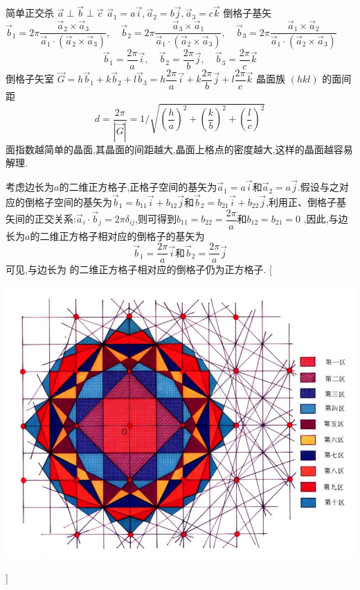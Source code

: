 \documentclass[UTF8,10pt,a4paper,oneside]{ctexart}
\begin{document}
        {简单正交杀 $\vec{a} \perp \vec{b} \perp \vec{c}$ $ \vec{a}_{1}=a\vec{i},\vec{a}_{2}=b \vec{j},\vec{a}_3=c\vec{k}$
        倒格子基矢 $\vec{b}_{1}=2 \pi \dfrac{\vec{a}_{2} \times \vec{a}_{3}}{\vec{a}_{1} \cdot (\vec{a}_{2} \times \vec{a}_{3})},\quad \vec{b}_{2}=2 \pi \dfrac{\vec{a}_{3} \times \vec{a}_{1}}{\vec{a}_{1} \cdot(\vec{a}_{2} \times \vec{a}_{3})},\quad \vec{b}_{3}=2 \pi \dfrac{\vec{a}_{1} \times \vec{a}_{2}}{\vec{a}_{1} \cdot (\vec{a}_{2} \times \vec{a}_{3})}$
        $$
        \vec{b}_{1}=\dfrac{2 \pi}{a} \vec{i},\quad \vec{b}_{2}=\dfrac{2 \pi}{b} \vec{j},\quad \vec{b}_{3}=\dfrac{2 \pi}{c} \vec{k}
        $$
        倒格子矢室 $\vec{G}=h \vec{b}_{1}+k \vec{b}_{2}+l \vec{b}_{3}=h \dfrac{2 \pi}{a} \vec{i}+k \dfrac{2 \pi}{b} \vec{j}+l \dfrac{2 \pi}{c} \vec{k}$ 晶面族  $(hkl)$ 的面间距
        $$
        d=\dfrac{2 \pi}{|\vec{G}|}=1 / \sqrt{(\dfrac{h}{a})^{2}+(\dfrac{k}{b})^{2}+(\dfrac{l}{c})^{2}}
        $$ 面指数越简单的晶面,其晶面的间距越大,晶面上格点的密度越大,这样的晶面越容易解理.}

    {考虑边长为$a$的二维正方格子,正格子空间的基矢为$\vec{a}_1=a\vec{i}$和$\vec{a}_2=a\vec{j}$.假设与之对应的倒格子空间的基矢为$\vec{b}_1=b_{11}\vec{i}+b_{12}\vec{j}$和$\vec{b}_2=b_{21}\vec{i}+b_{22}\vec{j}$,利用正、倒格子基矢间的正交关系:$\vec{a}_i \cdot \vec{b}_j =2 \pi \delta_{ij}$,则可得到$b_{11}=b_{22}=\dfrac{2 \pi}{a}$和$b_{12}=b_{21}=0$ ,因此,与边长为$a$的二维正方格子相对应的倒格子的基矢为\[\vec{b}_1=\dfrac{2 \pi}{a}\vec{i} \text{和} \vec{b}_2=\dfrac{2 \pi}{a}\vec{j}\]
     可见,与边长为  的二维正方格子相对应的倒格子仍为正方格子.}
     [\begin{center}
        \includegraphics{picture/3-10 .png}
    \end{center}]
\end{document}
